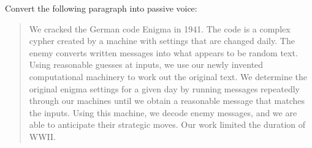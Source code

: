 \documentclass{article}
\begin{document}
Convert the following paragraph into passive voice:
\begin{quotation}
We cracked the German code Enigma in 1941.  The code is a complex cypher created by a machine with settings that are changed daily.  The enemy converts written messages into what appears to be random text.  Using reasonable guesses at inputs, we use our newly invented computational machinery to work out the original text.  We determine the original enigma settings for a given day by running messages repeatedly through our machines until we obtain a reasonable message that matches the inputs.  Using this machine, we decode enemy messages, and we are able to anticipate their strategic moves.  Our work limited the duration of WWII.
\end{quotation}
\end{document}
